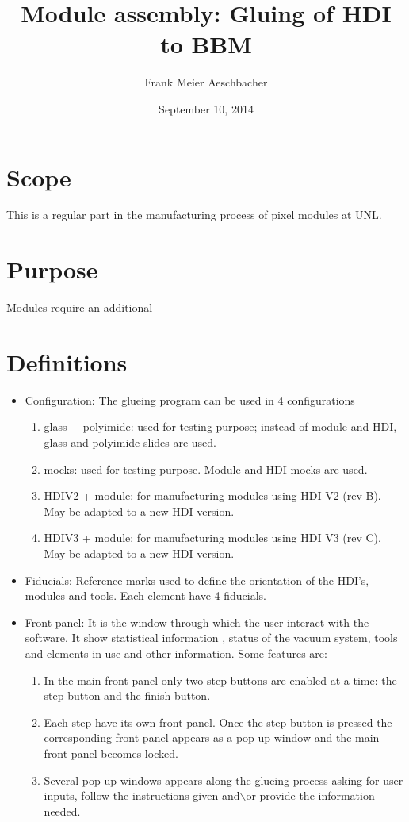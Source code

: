\documentclass[12pt]{unlsilabsop}
\title{Module assembly: Gluing of HDI to BBM}
\date{September 10, 2014}
\author{Frank Meier Aeschbacher}
\begin{document}
\maketitle

\section{Scope}
This is a regular part in the manufacturing process of pixel modules at UNL.

\section{Purpose}
Modules require an additional

\section{Definitions}

\begin{itemize}
\item Configuration: The glueing program can be used in 4 configurations
  \begin{enumerate}
  \item glass + polyimide: used for testing purpose; instead of module and HDI, glass and polyimide slides are used.
  \item mocks: used for testing purpose. Module and HDI mocks are used.
  \item HDIV2 + module: for manufacturing modules using HDI V2 (rev B). May be adapted to a new HDI version.
  \item HDIV3 + module: for manufacturing modules using HDI V3 (rev C). May be adapted to a new HDI version.
  \end{enumerate}
\item Fiducials: Reference marks used to define the orientation of the HDI's, modules and tools. Each element have 4 fiducials. 
\item Front panel: It is the window through which the user interact with the software. It show statistical information , status of the vacuum system, tools and elements in use and other information. Some features are:
  \begin{enumerate}
    \item In the main front panel only two step buttons are enabled at a time: the step button and the finish button. 
    \item Each step have its own front panel. Once the step button is pressed the corresponding front panel appears as a pop-up window and the main front panel becomes locked.
    \item Several pop-up windows appears along the glueing process asking for user inputs, follow the instructions given and$\backslash$or provide the information needed.
  \end{enumerate}
\end{itemize}
\end{document}
